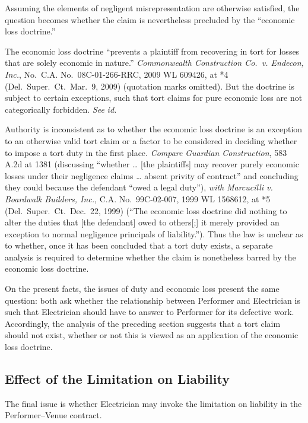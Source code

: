 \documentclass[
  12pt,
  letterpaper,
]{scrartcl}
\begin{document}
Assuming the elements of negligent misrepresentation are otherwise
satisfied, the question becomes whether the claim is nevertheless
precluded by the ``economic loss doctrine.''

The economic loss doctrine ``prevents a plaintiff from recovering in
tort for losses that are solely economic in nature.'' \emph{Commonwealth
Construction Co.~v. Endecon, Inc.}, No.~C.A. No.~08C-01-266-RRC, 2009 WL
609426, at *4 (Del.~Super.~Ct.~Mar.~9, 2009) (quotation marks
omitted). But the doctrine is subject to certain exceptions, such that
tort claims for pure economic loss are not categorically forbidden. \emph{See}
\emph{id.}

Authority is inconsistent as to whether the economic loss doctrine is an
exception to an otherwise valid tort claim or a factor to be considered
in deciding whether to impose a tort duty in the first place.
\emph{Compare} \emph{Guardian Construction}, 583 A.2d at 1381
(discussing ``whether \ldots{} {[}the plaintiffs{]} may recover purely
economic losses under their negligence claims \ldots{} absent privity of
contract'' and concluding they could because the defendant ``owed a legal duty''), \emph{with} \emph{Marcucilli v. Boardwalk Builders, Inc.},
C.A. No.~99C-02-007, 1999 WL 1568612, at *5 (Del.~Super.~Ct.~Dec.~22,
1999) (``The economic loss doctrine did nothing to alter the duties that
{[}the defendant{]} owed to others{[};{]} it merely provided an
exception to normal negligence principals of liability.''). Thus the law
is unclear as to whether, once it has been concluded that a tort duty
exists, a separate analysis is required to determine whether the claim
is nonetheless barred by the economic loss doctrine.

On the present facts, the issues of duty and economic loss present the
same question: both ask whether the relationship between Performer and
Electrician is such that Electrician should have to answer to Performer
for its defective work. Accordingly, the analysis of the preceding
section suggests that a tort claim should not exist, whether or not this
is viewed as an application of the economic loss doctrine.

\hypertarget{effect-of-the-limitation-on-liability}{%
\subsection{Effect of the Limitation on
Liability}\label{effect-of-the-limitation-on-liability}}

The final issue is whether Electrician may invoke the limitation on
liability in the Performer--Venue contract.
\end{document}
